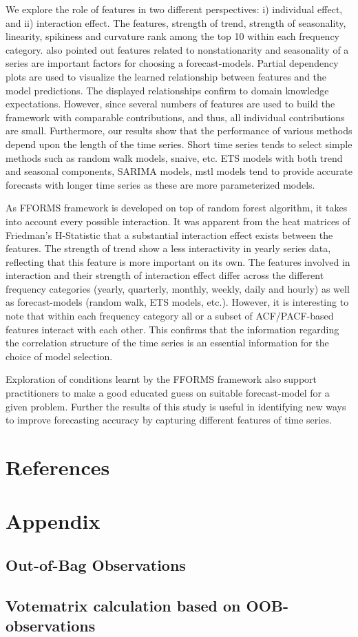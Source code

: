 \documentclass[11pt,a4paper,]{article}
\begin{document}
We explore the role of features in two different perspectives: i)
individual effect, and ii) interaction effect. The features, strength of
trend, strength of seasonality, linearity, spikiness and curvature rank
among the top 10 within each frequency category.
\textcite{lemke2010meta} also pointed out features related to
nonstationarity and seasonality of a series are important factors for
choosing a forecast-models. Partial dependency plots are used to
visualize the learned relationship between features and the model
predictions. The displayed relationships confirm to domain knowledge
expectations. However, since several numbers of features are used to
build the framework with comparable contributions, and thus, all
individual contributions are small. Furthermore, our results show that
the performance of various methods depend upon the length of the time
series. Short time series tends to select simple methods such as random
walk models, snaive, etc. ETS models with both trend and seasonal
components, SARIMA models, mstl models tend to provide accurate
forecasts with longer time series as these are more parameterized
models.

As FFORMS framework is developed on top of random forest algorithm, it
takes into account every possible interaction. It was apparent from the
heat matrices of Friedman's H-Statistic that a substantial interaction
effect exists between the features. The strength of trend show a less
interactivity in yearly series data, reflecting that this feature is
more important on its own. The features involved in interaction and
their strength of interaction effect differ across the different
frequency categories (yearly, quarterly, monthly, weekly, daily and
hourly) as well as forecast-models (random walk, ETS models, etc.).
However, it is interesting to note that within each frequency category
all or a subset of ACF/PACF-based features interact with each other.
This confirms that the information regarding the correlation structure
of the time series is an essential information for the choice of model
selection.

Exploration of conditions learnt by the FFORMS framework also support
practitioners to make a good educated guess on suitable forecast-model
for a given problem. Further the results of this study is useful in
identifying new ways to improve forecasting accuracy by capturing
different features of time series.

\section{References}\label{references}

\section{Appendix}\label{appendix}

\subsection{Out-of-Bag Observations}\label{out-of-bag-observations}

\subsection{Votematrix calculation based on
OOB-observations}\label{votematrix-calculation-based-on-oob-observations}

\printbibliography
\end{document}
